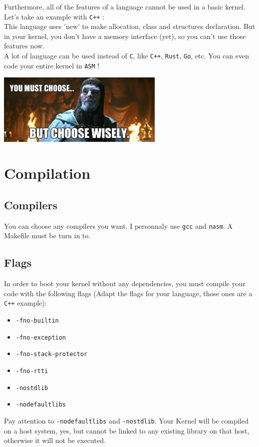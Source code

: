 \documentclass{42-en}
\begin{document}
			Furthermore, all of the features of a language cannot be used in a
			basic kernel. Let's take an example with \texttt{C++} :\\
			This language uses 'new' to make allocation, class and structures
			declaration. But in your kernel, you don't have a memory interface
			(yet), so you can't use those features now.\\

			A lot of language can be used instead of \texttt{C},
			like \texttt{C++}, \texttt{Rust}, \texttt{Go}, etc.
			You can even code your entire kernel in \texttt{ASM} !\\
			\begin{center}
			  \includegraphics[width=8cm]{choose.jpg}
			\end{center}

\newpage


	\section{Compilation}
		\subsection{Compilers}
			You can choose any compilers you want. I personnaly use	\texttt{gcc}
			and \texttt{nasm}. A Makefile must be turn in to.
		\subsection{Flags}
			In order to boot your kernel without any dependencies, you must compile
			your code with the following flags (Adapt the flags for your language,
			those ones are a \texttt{C++} example):
			\begin{itemize}\itemsep1pt
				\item \texttt{-fno-builtin}
				\item \texttt{-fno-exception}
				\item \texttt{-fno-stack-protector}
				\item \texttt{-fno-rtti}
				\item \texttt{-nostdlib}
				\item \texttt{-nodefaultlibs}
			\end{itemize}
			Pay attention to \texttt{-nodefaultlibs} and \texttt{-nostdlib}.
			Your Kernel will be compiled on a host system, yes, but cannot be
			linked to any existing library on that host, otherwise it will not
			be executed.
\end{document}
